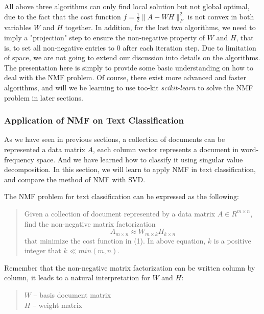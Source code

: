 \documentclass[12pt,letterpaper]{article}
\begin{document}
All above three algorithms can only find local solution but not global optimal, due to the fact that the cost function $f = \frac{1}{2} \|A - WH\|_F^2$ is not convex in both variables $W$ and $H$ together. In addition, for the last two algorithms, we need to imply a "projection" step to ensure the non-negative property of $W$ and $H$, that is, to set all non-negative entries to 0 after each iteration step. Due to limitation of space, we are not going to extend our discussion into details on the algorithms. The presentation here is simply to provide some basic understanding on how to deal with the NMF problem. Of course, there exist more advanced and faster algorithms, and will we be learning to use too-kit \textit{scikit-learn} to solve the NMF problem in later sections. 
\subsubsection{Application of NMF on Text Classification}
As we have seen in previous sections, a collection of documents can be represented a data matrix $A$, each column vector represents a document in word-frequency space. And we have learned how to classify it using singular value decomposition. In this section, we will learn to apply NMF in text classification, and compare the method of NMF with SVD. 

The NMF problem for text classification can be expressed as the following: 
\begin{quotation}
	\noindent Given a collection of document represented by a data matrix $A \in R^{m\times n}$, find the non-negative matrix factorization
	\begin{equation}
	A_{m\times n} \approx W_{m\times k} H_{k\times n}
	\end{equation}
	that minimize the cost function in (1). In above equation, $k$ is a positive integer that $k \ll min(m, n)$. 
\end{quotation}

Remember that the non-negative matrix factorization can be written column by column, it leads to a natural interpretation for $W$ and $H$:
\begin{quotation}
	\noindent $W$ -- basis document matrix \\
	$H$ -- weight matrix
\end{quotation} 
\end{document}
